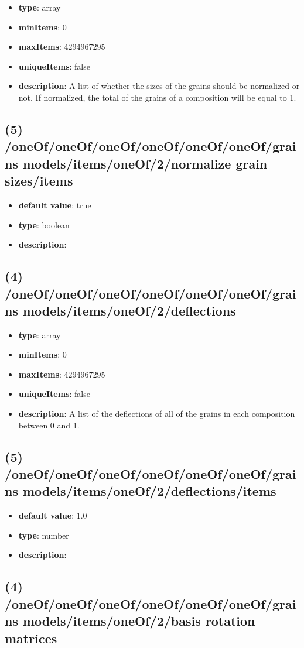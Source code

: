 \begin{itemize}[leftmargin=4em]\item {\bf type}: array
\item {\bf minItems}: 0
\item {\bf maxItems}: 4294967295
\item {\bf uniqueItems}: false
\item {\bf description}: A list of whether the sizes of the grains should be normalized or not. If normalized, the total of the grains of a composition will be equal to 1.
\end{itemize}\subsection{(5) /oneOf/oneOf/oneOf/oneOf/oneOf/oneOf/grains models/items/oneOf/2/normalize grain sizes/items}
\begin{itemize}[leftmargin=5em]\item {\bf default value}: true
\item {\bf type}: boolean
\item {\bf description}: 
\end{itemize}\subsection{(4) /oneOf/oneOf/oneOf/oneOf/oneOf/oneOf/grains models/items/oneOf/2/deflections}
\begin{itemize}[leftmargin=4em]\item {\bf type}: array
\item {\bf minItems}: 0
\item {\bf maxItems}: 4294967295
\item {\bf uniqueItems}: false
\item {\bf description}: A list of the deflections of all of the grains in each composition between 0 and 1.
\end{itemize}\subsection{(5) /oneOf/oneOf/oneOf/oneOf/oneOf/oneOf/grains models/items/oneOf/2/deflections/items}
\begin{itemize}[leftmargin=5em]\item {\bf default value}: 1.0
\item {\bf type}: number
\item {\bf description}: 
\end{itemize}\subsection{(4) /oneOf/oneOf/oneOf/oneOf/oneOf/oneOf/grains models/items/oneOf/2/basis rotation matrices}
